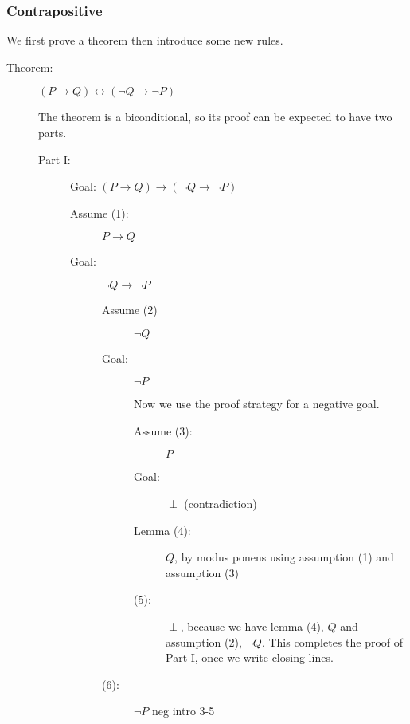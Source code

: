 \documentclass[12pt]{article}
\begin{document}
\newpage

\subsubsection{Contrapositive}

We first prove a theorem then introduce some new rules.

\begin{description}

\item[Theorem:] $(P \rightarrow Q) \leftrightarrow (\neg Q \rightarrow \neg P)$

The theorem is a biconditional, so its proof can be expected to have two parts.


\begin{description}
\item[Part I:]  Goal:  $(P \rightarrow Q) \rightarrow (\neg Q \rightarrow \neg P)$

\begin{description}

\item[Assume (1):]  $P \rightarrow Q$

\item[Goal:]  $\neg Q \rightarrow \neg P$

\begin{description}

\item[Assume (2)] $\neg Q$

\item[Goal:]  $\neg P$

Now we use the proof strategy for a negative goal.

\begin{description}

\item[Assume (3):]  $P$

\item[Goal:]  $\perp$ (contradiction)

\item[Lemma (4):]  $Q$, by modus ponens using assumption (1) and assumption (3)

\item[(5):] $\perp$, because we have lemma (4), $Q$ and
assumption (2), $\neg Q$.  This completes the proof of Part I, once we write closing lines.

\end{description}

\item[(6):]  $\neg P$ neg intro 3-5


\end{description}
\end{description}
\end{description}
\end{description}
\end{document}
